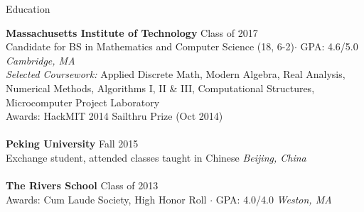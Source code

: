 \documentclass{resume} %
\begin{document}

\begin{rSection}{Education}

{\bf Massachusetts Institute of Technology} \hfill Class of 2017
\\ Candidate for BS in Mathematics and Computer Science (18, 6-2)$\cdot$ GPA: 4.6/5.0 \hfill {\em Cambridge, MA}
\\ {\em Selected Coursework:} 
Applied Discrete Math, Modern Algebra, Real Analysis, Numerical Methods,
Algorithms I, II \& III, Computational Structures, Microcomputer Project Laboratory
\\ Awards: HackMIT 2014 Sailthru Prize (Oct 2014)
\\
\\ {\bf Peking University} \hfill Fall 2015
\\ Exchange student, attended classes taught in Chinese  \hfill {\em Beijing, China}
\\
\\ {\bf The Rivers School} \hfill  Class of 2013
\\ Awards: Cum Laude Society, High Honor Roll $\cdot$ GPA: 4.0/4.0 \hfill {\em Weston, MA}

\end{rSection}

\end{document}
